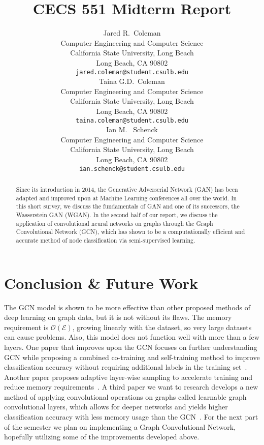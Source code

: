 \documentclass{article}
\title{CECS 551 Midterm Report}
\author{%
  Jared R.~Coleman\\
  Computer Engineering and Computer Science\\
  California State University, Long Beach\\
  Long Beach, CA 90802 \\
  \texttt{jared.coleman@student.csulb.edu} \\
  \And 
  Taina G.D.~Coleman\\
  Computer Engineering and Computer Science\\
  California State University, Long Beach\\
  Long Beach, CA 90802 \\
  \texttt{taina.coleman@student.csulb.edu} \\
  \And 
  Ian M. ~Schenck\\
  Computer Engineering and Computer Science\\
  California State University, Long Beach\\
  Long Beach, CA 90802 \\
  \texttt{ian.schenck@student.csulb.edu} \\
}
\begin{document}
\setcounter{equation}{0}

\maketitle

\begin{abstract}
   Since its introduction in 2014, the Generative Adverserial Network (GAN) has been adapted and improved upon at Machine Learning conferences all over the world. In this short survey, we discuss the fundamentals of GAN and one of its successors, the Wasserstein GAN (WGAN). In the second half of our report, we discuss the application of convolutional neural networks on graphs through the Graph Convolutional Network (GCN), which has shown to be a computationally efficient and accurate method of node classification via semi-supervised learning.
\end{abstract}





\section{Conclusion \& Future Work}
The GCN model is shown to be more effective than other proposed methods of deep learning on graph data, but it is not without its flaws. The memory requirement is $\mathcal{O}(\mathcal{E})$, growing linearly with the dataset, so very large datasets can cause problems. Also, this model does not function well with more than a few layers. One paper that improves upon the GCN focuses on further understanding GCN while proposing a combined co-training and self-training method to improve classification accuracy without requiring additional labels in the training set~\cite{Li2018}. Another paper proposes adaptive layer-wise sampling to accelerate training and reduce memory requirements~\cite{Huang2018}. A third paper we want to research develops a new method of applying convolutional operations on graphs called learnable graph convolutional layers, which allows for deeper networks and yields higher classification accuracy with less memory usage than the GCN~\cite{Gao2018}. For the next part of the semester we plan on implementing a Graph Convolutional Network, hopefully utilizing some of the improvements developed above.
  


\end{document}

